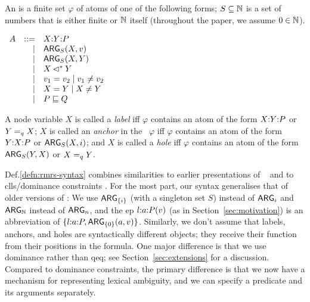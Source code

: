 \begin{definition}\label{defn:rmrs-syntax}
  An \emph{\rmrs} is a finite set $\varphi$ of atoms of one of the
  following forms; $S \subseteq \mathbb{N}$ is a set of numbers that is either
  finite or $\mathbb{N}$ itself (throughout the paper, we assume 
    $0 \in \mathbb{N}$).

$\begin{array}{rrll}
A &::= &\ep{X}{Y}{P} \\ %
&| &\ARG_S(X,v) \\ %
&| &\ARG_S(X,Y) \\ %
&| &X \dom Y \\ %
&| &v_1 = v_2 \;|\; v_1 \neq v_2 \\ %
&| &X = Y \;|\; X \neq Y \\ %
&| &P \spec Q %
\end{array}
$

A node variable $X$ is called a \emph{label} iff $\varphi$ contains an
atom of the form $X {:} Y {:} P$ or $Y =_q X$; $X$ is called an
\emph{anchor} in the \rmrs\ $\varphi$ iff $\varphi$ contains an atom
of the form $Y {:} X {:} P$ or $\mathsf{ARG}_S(X,i)$; and $X$ is called a
\emph{hole} iff $\varphi$ contains an atom of the form $\mathsf{ARG}_S(Y,X)$
or $X =_q Y$.
\end{definition}

Def.\ref{defn:rmrs-syntax}
combines similarities to earlier
presentations of \rmrs\ \cite{copestake:2003,copestake:2007b} and to
{\sc clls}/dominance constraints \cite{egg:etal:2001}.  For the most part,
our syntax generalises that of older versions of \rmrs: We use
$\mathsf{ARG}_{\{i\}}$ (with a singleton set $S$) instead of $\mathsf{ARG}_i$ and
$\mathsf{ARG}_{\mathbb{N}}$ instead of $\mathsf{ARG}_n$, and the {\sc ep} $l {:} a {:} P(v)$
(as in Section~\ref{sec:motivation}) is an abbreviation of
$\{l {:} a {:} P, \mathsf{ARG}_{\{0\}}(a,v)\}$.  Similarly, we don't assume
that labels, anchors, and holes are syntactically different objects;
they receive their function from their positions in the formula.  One
major difference is that we use dominance rather than qeq; see
Section~\ref{sec:extensions} for a discussion.  Compared to dominance
constraints, the primary difference is that we now have a mechanism
for representing lexical ambiguity, and we can specify a predicate and
its arguments separately.


